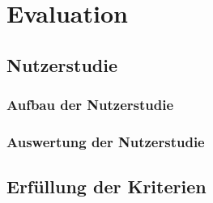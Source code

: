 
\chapter{Evaluation}
\label{chapter:evaluation}

\section{Nutzerstudie}

\subsection{Aufbau der Nutzerstudie}



\subsection{Auswertung der Nutzerstudie}



\section{Erfüllung der Kriterien}

